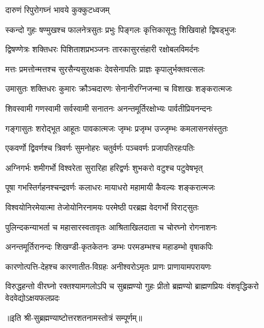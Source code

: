 
{दारुणं रिपुरोगघ्नं भावये कुक्कुटध्वजम्}

\twolineshloka
{स्कन्दो गुहः षण्मुखश्च फालनेत्रसुतः प्रभुः}
{पिङ्गलः कृत्तिकासूनुः शिखिवाहो द्विषड्भुजः}%

\twolineshloka
{द्विषण्णेत्रः शक्तिधरः पिशिताशप्रभञ्जनः}
{तारकासुरसंहारी रक्षोबलविमर्दनः}%

\twolineshloka
{मत्तः प्रमत्तोन्मत्तश्च सुरसैन्यसुरक्षकः}
{देवसेनापतिः प्राज्ञः कृपालुर्भक्तवत्सलः}%

\twolineshloka
{उमासुतः शक्तिधरः कुमारः क्रौञ्चदारणः}
{सेनानीरग्निजन्मा च विशाखः शङ्करात्मजः}%

\twolineshloka
{शिवस्वामी गणस्वामी सर्वस्वामी सनातनः}
{अनन्तमूर्तिरक्षोभ्यः पार्वतीप्रियनन्दनः}%

\twolineshloka
{गङ्गासुतः शरोद्भूत आहूतः पावकात्मजः}
{जृम्भः प्रजृम्भ उज्जृम्भः कमलासनसंस्तुतः}%

\twolineshloka
{एकवर्णो द्विवर्णश्च त्रिवर्णः सुमनोहरः}
{चतुर्वर्णः पञ्चवर्णः प्रजापतिरहःपतिः}%

\twolineshloka
{अग्निगर्भः शमीगर्भो विश्वरेता सुरारिहा}
{हरिद्वर्णः शुभकरो वटुश्च पटुवेषभृत्}%

\twolineshloka
{पूषा गभस्तिर्गहनश्चन्द्रवर्णः कलाधरः}
{मायाधरो महामायी कैवल्यः शङ्करात्मजः}%

\twolineshloka
{विश्वयोनिरमेयात्मा तेजोयोनिरनामयः}
{परमेष्ठी परब्रह्म वेदगर्भो विराट्सुतः}%

\twolineshloka
{पुलिन्दकन्याभर्ता च महासारस्वतावृतः}
{आश्रिताखिलदाता च चोरघ्नो रोगनाशनः}%

\twolineshloka
{अनन्तमूर्तिरानन्दः शिखण्डी-कृतकेतनः}
{डम्भः परमडम्भश्च महाडम्भो वृषाकपिः}%

\twolineshloka
{कारणोत्पत्ति-देहश्च कारणातीत-विग्रहः}
{अनीश्वरोऽमृतः प्राणः प्राणायामपरायणः}%

\threelineshloka
{विरुद्धहन्तो वीरघ्नो रक्तश्यामगलोऽपि च}
{सुब्रह्मण्यो गुहः प्रीतो ब्रह्मण्यो ब्राह्मणप्रियः}
{वंशवृद्धिकरो वेदवेद्योऽक्षयफलप्रदः}%

॥इति श्री-सुब्रह्मण्याष्टोत्तरशतनामस्तोत्रं सम्पूर्णम्॥
